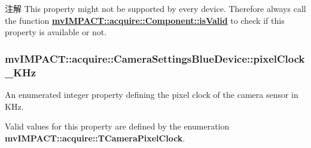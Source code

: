 \begin{DoxyNote}{注解}
This property might not be supported by every device. Therefore always call the function {\bfseries \hyperlink{classmv_i_m_p_a_c_t_1_1acquire_1_1_component_ac51e55e7e046101f3c6119d84123abd5}{mv\+I\+M\+P\+A\+C\+T\+::acquire\+::\+Component\+::is\+Valid}} to check if this property is available or not. 
\end{DoxyNote}
\hypertarget{classmv_i_m_p_a_c_t_1_1acquire_1_1_camera_settings_blue_device_a39df2b304078d58d4031ee2b00d9b7c3}{
\subsubsection[{pixel\+Clock\+\_\+\+K\+Hz}]{ mv\+I\+M\+P\+A\+C\+T\+::acquire\+::\+Camera\+Settings\+Blue\+Device\+::pixel\+Clock\+\_\+\+K\+Hz}}\label{classmv_i_m_p_a_c_t_1_1acquire_1_1_camera_settings_blue_device_a39df2b304078d58d4031ee2b00d9b7c3}


An enumerated integer property defining the pixel clock of the camera sensor in K\+Hz. 

Valid values for this property are defined by the enumeration {\bfseries mv\+I\+M\+P\+A\+C\+T\+::acquire\+::\+T\+Camera\+Pixel\+Clock}.

